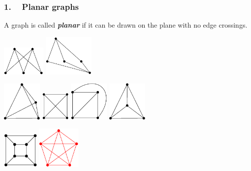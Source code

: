 \begin{frame}
\frametitle{1. ~ Planar graphs}


\bigskip

A graph is called \emph{\bfseries planar} if it can be drawn on the plane with no edge crossings.

\medskip \pause
\begin{center}
\includegraphics[width=60pt]{image-115.pdf} \hspace{30pt}
\includegraphics[width=70pt]{image-116.pdf}
\end{center}

\medskip \pause
\begin{center}
\includegraphics[width=55pt]{image-118-tetra.pdf} \hspace{20pt}
\includegraphics[width=40pt]{image-117.pdf} \hspace{20pt}
\includegraphics[width=55pt]{image-118.pdf} \hspace{20pt}
\includegraphics[width=55pt]{image-118-tetra2.pdf}
\end{center}

\medskip \pause
\begin{center}
\includegraphics[width=50pt]{image-124.pdf} \hspace{30pt} \pause
\includegraphics[width=60pt]{image-122-red.pdf}
\end{center}


\end{frame}
